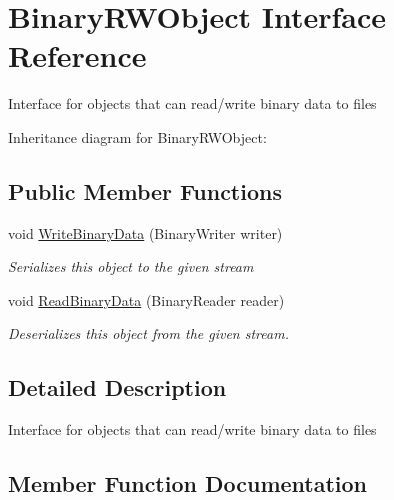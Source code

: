 \hypertarget{interface_binary_r_w_object}{}\section{Binary\+R\+W\+Object Interface Reference}
\label{interface_binary_r_w_object}


Interface for objects that can read/write binary data to files  




Inheritance diagram for Binary\+R\+W\+Object\+:
\subsection*{Public Member Functions}
\begin{DoxyCompactItemize}
\item 
void \hyperlink{interface_binary_r_w_object_a5e361e550b30dcd29759188cf67d177c}{Write\+Binary\+Data} (Binary\+Writer writer)
\begin{DoxyCompactList}\small\item\em Serializes this object to the given stream \end{DoxyCompactList}\item 
void \hyperlink{interface_binary_r_w_object_a2cd7d6b9aded677cffdb646b51328c5d}{Read\+Binary\+Data} (Binary\+Reader reader)
\begin{DoxyCompactList}\small\item\em Deserializes this object from the given stream. \end{DoxyCompactList}\end{DoxyCompactItemize}


\subsection{Detailed Description}
Interface for objects that can read/write binary data to files 



\subsection{Member Function Documentation}
\mbox{\label{interface_binary_r_w_object_a2cd7d6b9aded677cffdb646b51328c5d}} 
